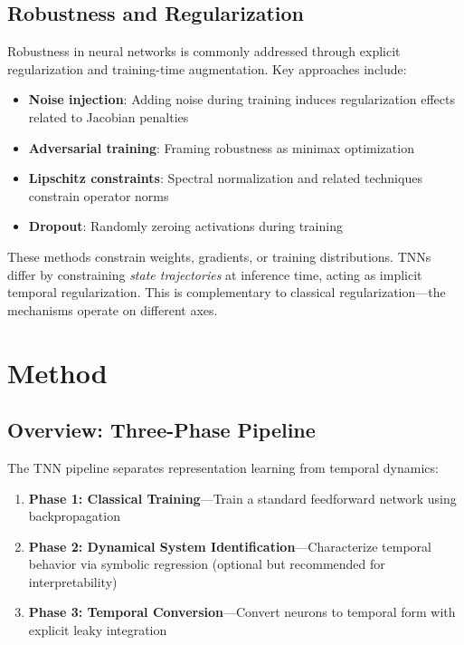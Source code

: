 \documentclass[11pt]{article}
\begin{document}
\subsection{Robustness and Regularization}

Robustness in neural networks is commonly addressed through explicit regularization and training-time augmentation. Key approaches include:

\begin{itemize}
    \item \textbf{Noise injection}: Adding noise during training induces regularization effects related to Jacobian penalties \citep{rifai2011jacobian, bishop1995training}
    \item \textbf{Adversarial training}: Framing robustness as minimax optimization \citep{madry2018robust}
    \item \textbf{Lipschitz constraints}: Spectral normalization and related techniques constrain operator norms \citep{miyato2018spectral}
    \item \textbf{Dropout}: Randomly zeroing activations during training \citep{srivastava2014dropout}
\end{itemize}

These methods constrain weights, gradients, or training distributions. TNNs differ by constraining \emph{state trajectories} at inference time, acting as implicit temporal regularization. This is complementary to classical regularization---the mechanisms operate on different axes.

\section{Method}

\subsection{Overview: Three-Phase Pipeline}

The TNN pipeline separates representation learning from temporal dynamics:

\begin{enumerate}
    \item \textbf{Phase 1: Classical Training}---Train a standard feedforward network using backpropagation
    \item \textbf{Phase 2: Dynamical System Identification}---Characterize temporal behavior via symbolic regression (optional but recommended for interpretability)
    \item \textbf{Phase 3: Temporal Conversion}---Convert neurons to temporal form with explicit leaky integration
\end{enumerate}
\end{document}
